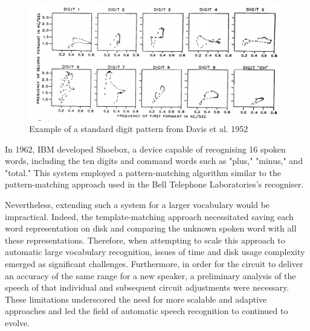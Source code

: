 \begin{figure}[h]
\includegraphics[width=\textwidth]{imgs/bell.png}
\caption{Example of a standard digit pattern from Davis et al. 1952}
\label{Bell}
\end{figure}


In 1962, IBM developed Shoebox, a device capable of recognising 16 spoken words, including the ten digits and command words such as "plus," "minus," and "total." This system employed a pattern-matching algorithm similar to the pattern-matching approach used in the Bell Telephone Laboratories's recogniser.


Nevertheless, extending such a system for a larger vocabulary would be impractical. Indeed, the template-matching approach necessitated saving each word representation on disk and comparing the unknown spoken word with all these representations. Therefore, when attempting to scale this approach to automatic large vocabulary recognition, issues of time and disk usage complexity emerged as significant challenges. Furthermore, in order for the circuit to deliver an accuracy of the same range for a new speaker, a preliminary analysis of the speech of that individual and subsequent circuit adjustments were necessary. These limitations underscored the need for more scalable and adaptive approaches and led the field of automatic speech recognition to continued to evolve.

